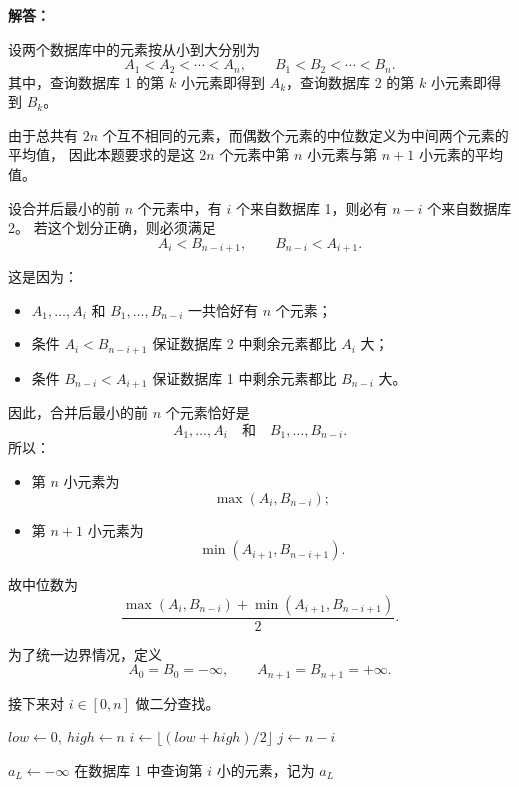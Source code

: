 ﻿\documentclass[12pt,a4paper]{article}
\begin{document}
\begin{answerbox}
\textbf{解答：}

设两个数据库中的元素按从小到大分别为
\[
A_1 < A_2 < \cdots < A_n,\qquad
B_1 < B_2 < \cdots < B_n.
\]
其中，查询数据库 1 的第 $k$ 小元素即得到 $A_k$，查询数据库 2 的第 $k$ 小元素即得到 $B_k$。

由于总共有 $2n$ 个互不相同的元素，而偶数个元素的中位数定义为中间两个元素的平均值，
因此本题要求的是这 $2n$ 个元素中第 $n$ 小元素与第 $n+1$ 小元素的平均值。

\vspace{0.5em}
设合并后最小的前 $n$ 个元素中，有 $i$ 个来自数据库 1，则必有 $n-i$ 个来自数据库 2。
若这个划分正确，则必须满足
\[
A_i < B_{n-i+1}, \qquad B_{n-i} < A_{i+1}.
\]

这是因为：

\begin{itemize}
    \item $A_1,\dots,A_i$ 和 $B_1,\dots,B_{n-i}$ 一共恰好有 $n$ 个元素；
    \item 条件 $A_i < B_{n-i+1}$ 保证数据库 2 中剩余元素都比 $A_i$ 大；
    \item 条件 $B_{n-i} < A_{i+1}$ 保证数据库 1 中剩余元素都比 $B_{n-i}$ 大。
\end{itemize}

因此，合并后最小的前 $n$ 个元素恰好是
\[
A_1,\dots,A_i \quad \text{和} \quad B_1,\dots,B_{n-i}.
\]
所以：

\begin{itemize}
    \item 第 $n$ 小元素为
    \[
    \max(A_i, B_{n-i});
    \]
    \item 第 $n+1$ 小元素为
    \[
    \min(A_{i+1}, B_{n-i+1}).
    \]
\end{itemize}

故中位数为
\[
\frac{\max(A_i, B_{n-i})+\min(A_{i+1}, B_{n-i+1})}{2}.
\]

为了统一边界情况，定义
\[
A_0 = B_0 = -\infty,\qquad A_{n+1} = B_{n+1} = +\infty.
\]

接下来对 $i \in [0,n]$ 做二分查找。

\begin{algorithm}[H]
\caption{利用二分查找求两个数据库合并后的中位数}
\label{alg:median-two-databases}
\begin{algorithmic}[1]
\STATE $low \leftarrow 0,\ high \leftarrow n$
    \STATE $i \leftarrow \lfloor (low+high)/2 \rfloor$
    \STATE $j \leftarrow n-i$
    
        \STATE $a_L \leftarrow -\infty$
    \ELSE
        \STATE 在数据库 1 中查询第 $i$ 小的元素，记为 $a_L$
    \ENDIF
    

\end{algorithmic}
\end{algorithm}
\end{answerbox}
\end{document}
